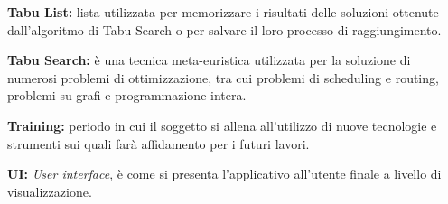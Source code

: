 \begin{description}
    \item \label{Tabu List} \textbf{Tabu List:} lista utilizzata per memorizzare i risultati delle soluzioni ottenute dall'algoritmo di Tabu Search o per salvare il loro processo di raggiungimento.
    \item \label{Tabu Search} \textbf{Tabu Search:} è una tecnica meta-euristica utilizzata per la soluzione di numerosi problemi di ottimizzazione, tra cui problemi di scheduling e routing, 
    problemi su grafi e programmazione intera.
    \item \label{Training} \textbf{Training:} periodo in cui il soggetto si allena all'utilizzo di nuove tecnologie e strumenti sui quali farà affidamento per i futuri lavori.
    \item \label{UI} \textbf{UI:} \textit{User interface}, è come si presenta l'applicativo all'utente finale a livello di visualizzazione. 
    
\end{description}
